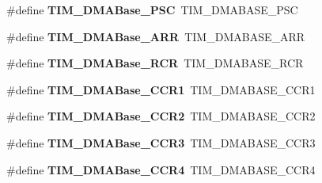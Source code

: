 \begin{DoxyCompactItemize}
\item 
\hypertarget{group___h_a_l___t_i_m___aliased___defines_gab8dd06970f235fe9f6997e0975237388}{\#define {\bfseries T\-I\-M\-\_\-\-D\-M\-A\-Base\-\_\-\-P\-S\-C}~T\-I\-M\-\_\-\-D\-M\-A\-B\-A\-S\-E\-\_\-\-P\-S\-C}\label{group___h_a_l___t_i_m___aliased___defines_gab8dd06970f235fe9f6997e0975237388}

\item 
\hypertarget{group___h_a_l___t_i_m___aliased___defines_gaab8a66f70e59b5916b4bba344746d652}{\#define {\bfseries T\-I\-M\-\_\-\-D\-M\-A\-Base\-\_\-\-A\-R\-R}~T\-I\-M\-\_\-\-D\-M\-A\-B\-A\-S\-E\-\_\-\-A\-R\-R}\label{group___h_a_l___t_i_m___aliased___defines_gaab8a66f70e59b5916b4bba344746d652}

\item 
\hypertarget{group___h_a_l___t_i_m___aliased___defines_ga97f9edceee5c99b32aaa2c6daf849b7d}{\#define {\bfseries T\-I\-M\-\_\-\-D\-M\-A\-Base\-\_\-\-R\-C\-R}~T\-I\-M\-\_\-\-D\-M\-A\-B\-A\-S\-E\-\_\-\-R\-C\-R}\label{group___h_a_l___t_i_m___aliased___defines_ga97f9edceee5c99b32aaa2c6daf849b7d}

\item 
\hypertarget{group___h_a_l___t_i_m___aliased___defines_ga235a47fa47fd19594a111e6e48c0d5a2}{\#define {\bfseries T\-I\-M\-\_\-\-D\-M\-A\-Base\-\_\-\-C\-C\-R1}~T\-I\-M\-\_\-\-D\-M\-A\-B\-A\-S\-E\-\_\-\-C\-C\-R1}\label{group___h_a_l___t_i_m___aliased___defines_ga235a47fa47fd19594a111e6e48c0d5a2}

\item 
\hypertarget{group___h_a_l___t_i_m___aliased___defines_ga0e2150dcd3afe31ecb793aa471b3b972}{\#define {\bfseries T\-I\-M\-\_\-\-D\-M\-A\-Base\-\_\-\-C\-C\-R2}~T\-I\-M\-\_\-\-D\-M\-A\-B\-A\-S\-E\-\_\-\-C\-C\-R2}\label{group___h_a_l___t_i_m___aliased___defines_ga0e2150dcd3afe31ecb793aa471b3b972}

\item 
\hypertarget{group___h_a_l___t_i_m___aliased___defines_ga590c90085bd2b206b941dff2731fed74}{\#define {\bfseries T\-I\-M\-\_\-\-D\-M\-A\-Base\-\_\-\-C\-C\-R3}~T\-I\-M\-\_\-\-D\-M\-A\-B\-A\-S\-E\-\_\-\-C\-C\-R3}\label{group___h_a_l___t_i_m___aliased___defines_ga590c90085bd2b206b941dff2731fed74}

\item 
\hypertarget{group___h_a_l___t_i_m___aliased___defines_ga5e84a16e7d8ea369a3a55bb6fe1f2171}{\#define {\bfseries T\-I\-M\-\_\-\-D\-M\-A\-Base\-\_\-\-C\-C\-R4}~T\-I\-M\-\_\-\-D\-M\-A\-B\-A\-S\-E\-\_\-\-C\-C\-R4}\label{group___h_a_l___t_i_m___aliased___defines_ga5e84a16e7d8ea369a3a55bb6fe1f2171}


\end{DoxyCompactItemize}
